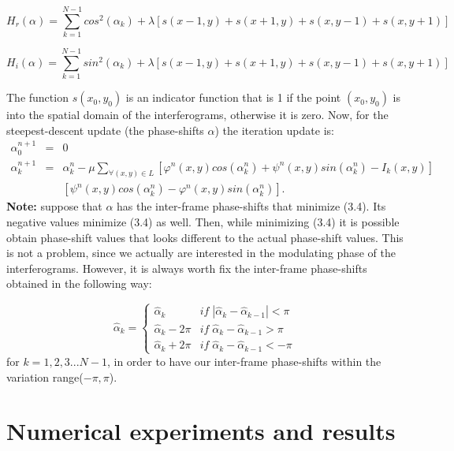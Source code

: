 \begin{small}
\begin{equation}
H_{r}(\alpha)=\sum_{k=1}^{N-1}cos^{2}(\alpha_{k})+\lambda[s(x-1,y)+s(x+1,y)+s(x,
y-1)+s(x,y+1)]
\end{equation}

\begin{equation}
H_{i}(\alpha)=\sum_{k=1}^{N-1}sin^{2}(\alpha_{k})+\lambda[s(x-1,y)+s(x+1,y)+s(x,
y-1)+s(x,y+1)]
\end{equation}
\end{small}
The function $s(x_{0},y_{0})$ is an indicator function that is 1
if the point $(x_{0},y_{0})$ is into the spatial domain of the interferograms,
otherwise it is zero. Now, for the steepest-descent update (the phase-shifts
$\alpha$) the iteration update is:
\begin{eqnarray}
\alpha_{0}^{n+1} & = & 0\\
\alpha_{k}^{n+1} & = & \alpha_{k}^{n}-\mu\sum_{\forall(x,y)\in L}[\varphi^{n}(x,
y)cos(\alpha_{k}^{n})+\psi^{n}(x,y)sin(\alpha_{k}^{n})-I_{k}(x,y)]\nonumber \\
 &  & [\psi^{n}(x,y)cos(\alpha_{k}^{n})-\varphi^{n}(x,y)sin(\alpha_{k}^{n})].
\end{eqnarray}
\textbf{Note:} suppose that $\alpha$ has the inter-frame phase-shifts
that minimize (3.4). Its negative values minimize (3.4) as well. Then,
while minimizing (3.4) it is possible obtain phase-shift values that
looks different to the actual phase-shift values. This is not a problem,
since we actually are interested in the modulating phase of the interferograms.
However, it is always worth fix the inter-frame phase-shifts obtained
in the following way:

\begin{equation}
\widehat{\alpha}_{k}=\begin{cases}
\widehat{\alpha}_{k} & if\;|\widehat{\alpha}_{k}-\widehat{\alpha}_{k-1}|<\pi\\
\widehat{\alpha}_{k}-2\pi &
if\;\widehat{\alpha}_{k}-\widehat{\alpha}_{k-1}>\pi\\
\widehat{\alpha}_{k}+2\pi & if\;\widehat{\alpha}_{k}-\widehat{\alpha}_{k-1}<-\pi
\end{cases}
\end{equation}
for $k=1,2,3...N-1$, in order to have our inter-frame
phase-shifts within the variation range($-\pi,\pi$).


\section{Numerical experiments and results}

